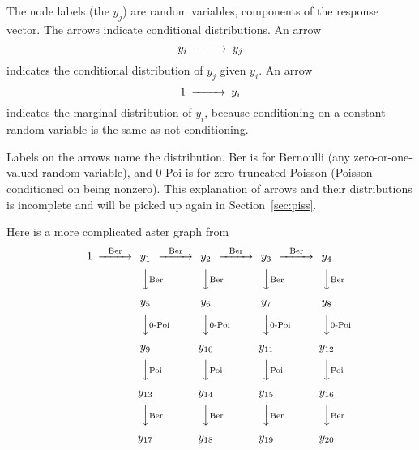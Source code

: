 The node labels (the $y_j$) are random variables, components of the response
vector.  The arrows indicate conditional distributions.
An arrow
\begin{equation} \label{gr:one-arrow-conditional}
\begin{CD}
   y_i @>>> y_j
\end{CD}
\end{equation}
indicates the conditional distribution of $y_j$ given $y_i$.
An arrow
\begin{equation} \label{gr:one-arrow-marginal}
\begin{CD}
   1 @>>> y_i
\end{CD}
\end{equation}
indicates the marginal distribution of $y_i$,
because conditioning on a constant random variable is the same as not
conditioning.

Labels on the arrows name the distribution.
Ber is for Bernoulli (any zero-or-one-valued random variable), and
0-Poi is for zero-truncated Poisson (Poisson conditioned on being nonzero).
This explanation of arrows and their distributions is incomplete and will
be picked up again in Section~\ref{sec:piss}.

Here is a more complicated aster graph from \citet{aster3}
\begin{equation} \label{gr:aster3}
\begin{CD}
   1
   @>\text{Ber}>>
   y_1
   @>\text{Ber}>>
   y_2
   @>\text{Ber}>>
   y_3
   @>\text{Ber}>>
   y_4
   \\
   @.
   @VV\text{Ber}V
   @VV\text{Ber}V
   @VV\text{Ber}V
   @VV\text{Ber}V
   \\
   \hphantom{1}
   @.
   y_5
   @.
   y_6
   @.
   y_7
   @.
   y_8
   \\
   @.
   @VV\text{0-Poi}V
   @VV\text{0-Poi}V
   @VV\text{0-Poi}V
   @VV\text{0-Poi}V
   \\
   \hphantom{1}
   @.
   y_9
   @.
   y_{10}
   @.
   y_{11}
   @.
   y_{12}
   \\
   @.
   @VV\text{Poi}V
   @VV\text{Poi}V
   @VV\text{Poi}V
   @VV\text{Poi}V
   \\
   \hphantom{1}
   @.
   y_{13}
   @.
   y_{14}
   @.
   y_{15}
   @.
   y_{16}
   \\
   @.
   @VV\text{Ber}V
   @VV\text{Ber}V
   @VV\text{Ber}V
   @VV\text{Ber}V
   \\
   \hphantom{1}
   @.
   y_{17}
   @.
   y_{18}
   @.
   y_{19}
   @.
   y_{20}
\end{CD}
\end{equation}

